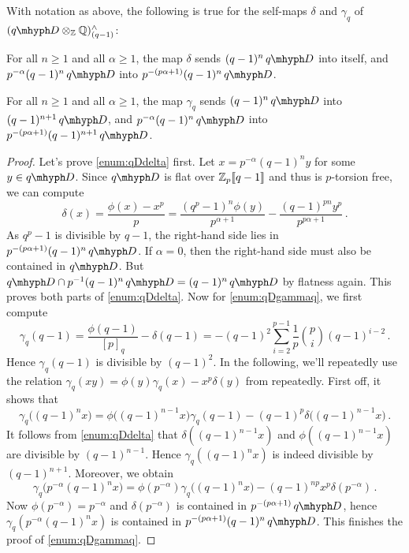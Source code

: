 \documentclass[DIV=12,numbers=enddot,leqno,bibliography=totoc]{scrartcl}
\begin{document}
	\begin{lem}\label{lem:RationalisationTechnicalI}
		With notation as above, the following is true for the self-maps $\delta$ and $\gamma_q$ of $(\q D\otimes_{\IZ}\IQ)_{(q-1)}^\complete$:
		\begin{alphanumerate}
			\item For all $n\geqslant 1$ and all $\alpha\geqslant 1$, the map $\delta$ sends $(q-1)^n\q D$ into itself, and $p^{-\alpha}(q-1)^n\q D$ into $p^{-(p\alpha+1)}(q-1)^n\q D$.\label{enum:qDdelta}
			\item For all $n\geqslant 1$ and all $\alpha\geqslant 1$, the map $\gamma_q$ sends $(q-1)^n\q D$ into $(q-1)^{n+1}\q D$, and $p^{-\alpha}(q-1)^n\q D$ into $p^{-(p\alpha+1)}(q-1)^{n+1}\q D$.\label{enum:qDgammaq}
		\end{alphanumerate}
	\end{lem}
	\begin{proof}
		Let's prove \cref{enum:qDdelta} first. Let $x=p^{-\alpha}(q-1)^ny$ for some $y\in \q D$. Since $\q D$ is flat over $\mathbb{Z}_p\llbracket q-1\rrbracket$ and thus is $p$-torsion free, we can compute
		\begin{equation*}
			\delta(x)=\frac{\phi(x)-x^p}{p}=\frac{(q^p-1)^n\phi(y)}{p^{\alpha+1}}-\frac{(q-1)^{pn}y^p}{p^{p\alpha+1}}\,.
		\end{equation*}
		As $q^p-1$ is divisible by $q-1$, the right-hand side lies in $p^{-(p\alpha+1)}(q-1)^{n}\q D$. If $\alpha=0$, then the right-hand side must also be contained in $\q D$. But $\q D\cap p^{-1}(q-1)^n\q D=(q-1)^n\q D$ by flatness again. This proves both parts of \cref{enum:qDdelta}. Now for \cref{enum:qDgammaq}, we first compute
		\begin{equation*}
			\gamma_q(q-1)=\frac{\phi(q-1)}{[p]_q}-\delta(q-1)=-(q-1)^2\sum_{i=2}^{p-1}\frac{1}{p}\binom{p}{i}(q-1)^{i-2}\,.
		\end{equation*}
		Hence $\gamma_q(q-1)$ is divisible by $(q-1)^2$. 
		In the following, we'll repeatedly use the relation $\gamma_q(xy)=\phi(y)\gamma_q(x)-x^p\delta(y)$ from \cite[Remark~]{Prismatic} repeatedly. First off, it shows that 
		\begin{equation*}
			\gamma_q\bigl((q-1)^nx\bigr)=\phi\bigl((q-1)^{n-1}x\bigr)\gamma_q(q-1)-(q-1)^p\delta\bigl((q-1)^{n-1}x\bigr)\,.
		\end{equation*}
		It follows from \cref{enum:qDdelta} that $\delta((q-1)^{n-1}x)$ and $\phi((q-1)^{n-1}x)$ are divisible by $(q-1)^{n-1}$. Hence $\gamma_q((q-1)^nx)$ is indeed divisible by $(q-1)^{n+1}$. Moreover, we obtain
		\begin{equation*}
			\gamma_q\bigl(p^{-\alpha}(q-1)^nx\bigr)=\phi(p^{-\alpha})\gamma_q\bigl((q-1)^nx\bigr)-(q-1)^{np}x^p\delta(p^{-\alpha})\,.
		\end{equation*}
		Now $\phi(p^{-\alpha})=p^{-\alpha}$ and $\delta(p^{-\alpha})$ is contained in $p^{-(p\alpha+1)}\q D$, hence $\gamma_q(p^{-\alpha}(q-1)^nx)$ is contained in $p^{-(p\alpha+1)}(q-1)^n\q D$. This finishes the proof of \cref{enum:qDgammaq}.
	\end{proof}
\end{document}
